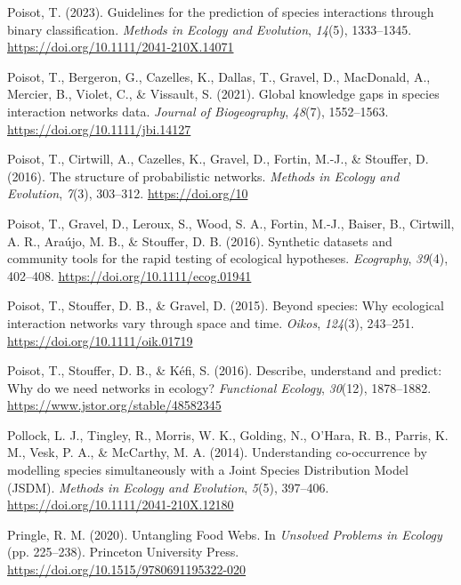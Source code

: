 \documentclass[
]{article}
\newlength{\cslhangindent}
\newenvironment{CSLReferences}[2] %
 {\begin{list}{}{%
  \setlength{\itemindent}{0pt}
  \setlength{\leftmargin}{0pt}
  \setlength{\parsep}{0pt}
  \ifodd #1
   \setlength{\leftmargin}{\cslhangindent}
   \setlength{\itemindent}{-1\cslhangindent}
  \fi
  \setlength{\itemsep}{#2\baselineskip}}}
 {\end{list}}
\begin{document}
\begin{CSLReferences}{1}{0}
Poisot, T. (2023). Guidelines for the prediction of species interactions
through binary classification. \emph{Methods in Ecology and Evolution},
\emph{14}(5), 1333--1345. \url{https://doi.org/10.1111/2041-210X.14071}

Poisot, T., Bergeron, G., Cazelles, K., Dallas, T., Gravel, D.,
MacDonald, A., Mercier, B., Violet, C., \& Vissault, S. (2021). Global
knowledge gaps in species interaction networks data. \emph{Journal of
Biogeography}, \emph{48}(7), 1552--1563.
\url{https://doi.org/10.1111/jbi.14127}

Poisot, T., Cirtwill, A., Cazelles, K., Gravel, D., Fortin, M.-J., \&
Stouffer, D. (2016). The structure of probabilistic networks.
\emph{Methods in Ecology and Evolution}, \emph{7}(3), 303--312.
\url{https://doi.org/10}

Poisot, T., Gravel, D., Leroux, S., Wood, S. A., Fortin, M.-J., Baiser,
B., Cirtwill, A. R., Araújo, M. B., \& Stouffer, D. B. (2016). Synthetic
datasets and community tools for the rapid testing of ecological
hypotheses. \emph{Ecography}, \emph{39}(4), 402--408.
\url{https://doi.org/10.1111/ecog.01941}

Poisot, T., Stouffer, D. B., \& Gravel, D. (2015). Beyond species: Why
ecological interaction networks vary through space and time.
\emph{Oikos}, \emph{124}(3), 243--251.
\url{https://doi.org/10.1111/oik.01719}

Poisot, T., Stouffer, D. B., \& Kéfi, S. (2016). Describe, understand
and predict: Why do we need networks in ecology? \emph{Functional
Ecology}, \emph{30}(12), 1878--1882.
\url{https://www.jstor.org/stable/48582345}

Pollock, L. J., Tingley, R., Morris, W. K., Golding, N., O'Hara, R. B.,
Parris, K. M., Vesk, P. A., \& McCarthy, M. A. (2014). Understanding
co-occurrence by modelling species simultaneously with a {Joint Species
Distribution Model} ({JSDM}). \emph{Methods in Ecology and Evolution},
\emph{5}(5), 397--406. \url{https://doi.org/10.1111/2041-210X.12180}

Pringle, R. M. (2020). Untangling {Food Webs}. In \emph{Unsolved
{Problems} in {Ecology}} (pp. 225--238). Princeton University Press.
\url{https://doi.org/10.1515/9780691195322-020}


\end{CSLReferences}
\end{document}
